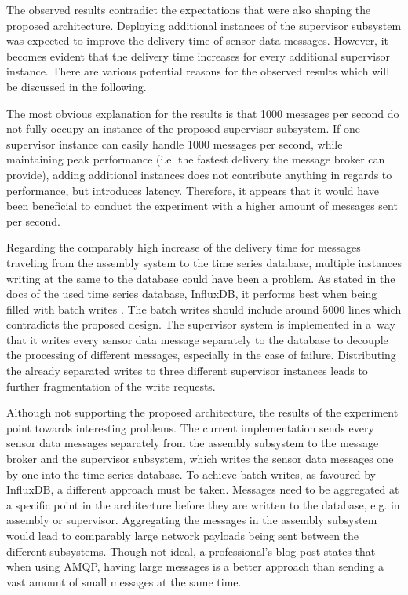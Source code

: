 \documentclass[conference]{IEEEtran}
\begin{document}
The observed results contradict the expectations that were also shaping the proposed architecture. Deploying additional instances of the supervisor subsystem was expected to improve the delivery time of sensor data messages. However, it becomes evident that the delivery time increases for every additional supervisor instance. There are various potential reasons for the observed results which will be discussed in the following.

The most obvious explanation for the results is that 1000 messages per second do not fully occupy an instance of the proposed supervisor subsystem. If one supervisor instance can easily handle 1000 messages per second, while maintaining peak performance (i.e. the fastest delivery the message broker can provide), adding additional instances does not contribute anything in regards to performance, but introduces latency. Therefore, it appears that it would have been beneficial to conduct the experiment with a higher amount of messages sent per second.

Regarding the comparably high increase of the delivery time for messages traveling from the assembly system to the time series database, multiple instances writing at the same to the database could have been a problem. As stated in the docs of the used time series database, InfluxDB, it performs best when being filled with batch writes \cite{influxdata_inc_optimize_2023}. The batch writes should include around 5000 lines which contradicts the proposed design. The supervisor system is implemented in a~way that it writes every sensor data message separately to the database to decouple the processing of different messages, especially in the case of failure. Distributing the already separated writes to three different supervisor instances leads to further fragmentation of the write requests.

Although not supporting the proposed architecture, the results of the experiment point towards interesting problems. The current implementation sends every sensor data messages separately from the assembly subsystem to the message broker and the supervisor subsystem, which writes the sensor data messages one by one into the time series database. To achieve batch writes, as favoured by InfluxDB, a different approach must be taken. Messages need to be aggregated at a specific point in the architecture before they are written to the database, e.g. in assembly or supervisor. Aggregating the messages in the assembly subsystem would lead to comparably large network payloads being sent between the different subsystems. Though not ideal, a professional's blog post \cite{lovisa_johansson_part_2019} states that when using AMQP, having large messages is a better approach than sending a vast amount of small messages at the same time.
\end{document}
